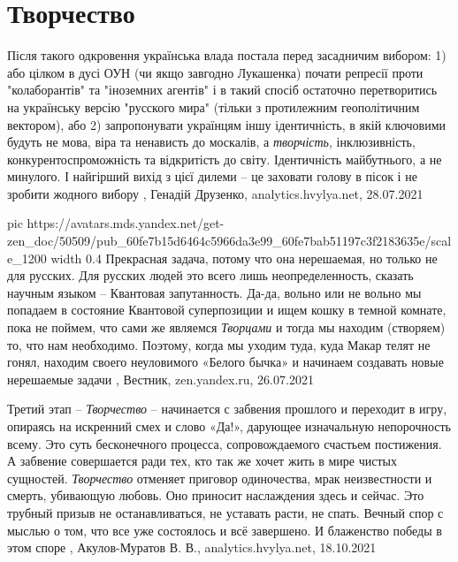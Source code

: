  
 
 
 
 
\chapter{Творчество}
\label{sec:slova.tvorchestvo}

Після такого одкровення українська влада постала перед засадничим вибором: 1)
або цілком в дусі ОУН (чи якщо завгодно Лукашенка) почати репресії проти
"колаборантів" та "іноземних агентів" і в такий спосіб остаточно перетворитись
на українську версію "русского мира" (тільки з протилежним геополітичним
вектором), або 2) запропонувати українцям іншу ідентичність, в якій ключовими
будуть не мова, віра та ненависть до москалів, а \emph{творчість},
інклюзивність, конкурентоспроможність та відкритість до світу. Ідентичність
майбутнього, а не минулого.  І найгірший вихід з цієї дилеми – це заховати
голову в пісок і не зробити жодного вибору
, 
Генадій Друзенко, analytics.hvylya.net, 28.07.2021

\ifcmt
  pic https://avatars.mds.yandex.net/get-zen_doc/50509/pub_60fe7b15d6464c5966da3e99_60fe7bab51197c3f2183635e/scale_1200
  width 0.4
\fi
Прекрасная задача, потому что она нерешаемая, но только не для русских. Для
русских людей это всего лишь неопределенность, сказать научным языком –
Квантовая запутанность. Да-да, вольно или не вольно мы попадаем в состояние
Квантовой суперпозиции и ищем кошку в темной комнате, пока не поймем, что сами
же являемся \emph{Творцами} и тогда мы находим (створяем) то, что нам необходимо.
Поэтому, когда мы уходим туда, куда Макар телят не гонял, находим своего
неуловимого «Белого бычка» и начинаем создавать новые нерешаемые задачи
, Вестник, zen.yandex.ru, 26.07.2021 

Третий этап – \emph{Творчество} – начинается с забвения прошлого и переходит в игру,
опираясь на искренний смех и слово «Да!», дарующее изначальную непорочность
всему. Это суть бесконечного процесса, сопровождаемого счастьем постижения. А
забвение совершается ради тех, кто так же хочет жить в мире чистых сущностей.
\emph{Творчество} отменяет приговор одиночества, мрак неизвестности и смерть,
убивающую любовь. Оно приносит наслаждения здесь и сейчас. Это трубный призыв
не останавливаться, не уставать расти, не спать. Вечный спор с мыслью о том,
что все уже состоялось и всё завершено. И блаженство победы в этом споре
, 
Акулов-Муратов В. В., analytics.hvylya.net, 18.10.2021

